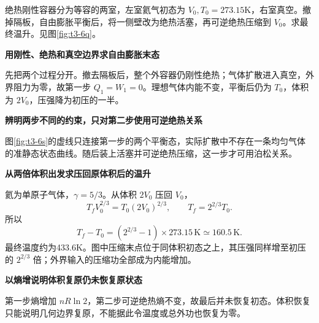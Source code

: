 \par\medskip\noindent\begin{minipage}{\textwidth}
\begin{example}[自由膨胀后再绝热压缩]\label{t3-6}
绝热刚性容器分为等容的两室，左室氦气初态为 $V_0,T_0=273.15$K，右室真空。撤掉隔板，自由膨胀平衡后，将一侧壁改为绝热活塞，再可逆绝热压缩到 $V_0$。求最终温升。见图\ref{fig:t3-6q}。
\end{example}
\end{minipage}
\begin{solution}\textbf{用刚性、绝热和真空边界求自由膨胀末态}\par\nobreak
先把两个过程分开。撤去隔板后，整个外容器仍刚性绝热；气体扩散进入真空，外界阻力为零，故第一步 $Q_1=W_1=0$。理想气体内能不变，平衡后仍为 $T_0$，体积为 $2V_0$，压强降为初压的一半。


\par\medskip{}\noindent\textbf{辨明两步不同的约束，只对第二步使用可逆绝热关系}\par\nobreak
图\ref{fig:t3-6s}的虚线只连接第一步的两个平衡态，实际扩散中不存在一条均匀气体的准静态状态曲线。随后装上活塞并可逆绝热压缩，这一步才可用泊松关系。



\par\medskip{}\noindent\textbf{从两倍体积出发求压回原体积后的温升}\par\nobreak
氦为单原子气体，$\gamma=5/3$。从体积 $2V_0$ 压回 $V_0$，
\[T_fV_0^{2/3}=T_0(2V_0)^{2/3},\qquad T_f=2^{2/3}T_0.\]
所以
\[\boxed{T_f-T_0=(2^{2/3}-1)\times273.15\,\mathrm K\simeq160.5\,\mathrm K}.\]
最终温度约为433.6K。图中压缩末点位于同体积初态之上，其压强同样增至初压的 $2^{2/3}$ 倍；外界输入的压缩功全部成为内能增加。


\par\medskip{}\noindent\textbf{以熵增说明体积复原仍未恢复原状态}\par\nobreak
第一步熵增加 $nR\ln2$，第二步可逆绝热熵不变，故最后并未恢复初态。体积恢复只能说明几何边界复原，不能据此令温度或总外功也恢复为零。
\end{solution}
